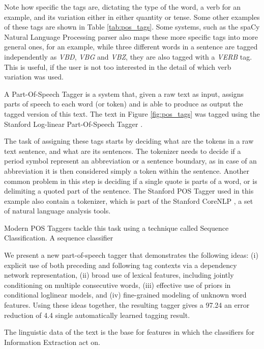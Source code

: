 \documentclass[11pt,a4paper,openright]{memoir}
\begin{document}
Note how specific the tags are, dictating the type of the word, a verb for an example, and its variation either in either quantity or tense. Some other examples of these tags are shown in Table \ref{tab:pos_tags}. Some systems, such as the spaCy Natural Language Processing parser \cite{honnibal-johnson:2015:EMNLP, spacy} also maps these more specific tags into more general ones, for an example, while three different words in a sentence are tagged independently as \emph{VBD}, \emph{VBG} and \emph{VBZ}, they are also tagged with a \emph{VERB} tag. This is useful, if the user is not too interested in the detail of which verb variation was used.

A Part-Of-Speech Tagger is a system that, given a raw text as input, assigns parts of speech to each word (or token) and is able to produce as output the tagged version of this text. The text in Figure \ref{fig:pos_tags} was tagged using the Stanford Log-linear Part-Of-Speech Tagger \cite{Toutanova:2003:FPT:1073445.1073478}.

The task of assigning these tags starts by deciding what are the tokens in a raw text sentence, and what are its sentences. The tokenizer needs to decide if a period symbol represent an abbreviation or a sentence boundary, as in case of an abbreviation it is then considered simply a token within the sentence. Another common problem in this step is deciding if a single quote is parts of a word, or is delimiting a quoted part of the sentence. The Stanford POS Tagger used in this example also contain a tokenizer, which is part of the Stanford CoreNLP \cite{manning-EtAl:2014:P14-5}, a set of natural language analysis tools.

Modern POS Taggers tackle this task using a technique called Sequence Classification. A sequence classifier

We present a new part-of-speech tagger that
demonstrates the following ideas: (i) explicit
use of both preceding and following tag contexts
via a dependency network representation,
(ii) broad use of lexical features, including
jointly conditioning on multiple consecutive
words, (iii) effective use of priors in conditional
loglinear models, and (iv) fine-grained
modeling of unknown word features. Using
these ideas together, the resulting tagger gives
a 97.24%
an error reduction of 4.4%
single automatically learned tagging result.

The linguistic data of the text is the base for features in which the classifiers for Information Extraction act on.
\end{document}
